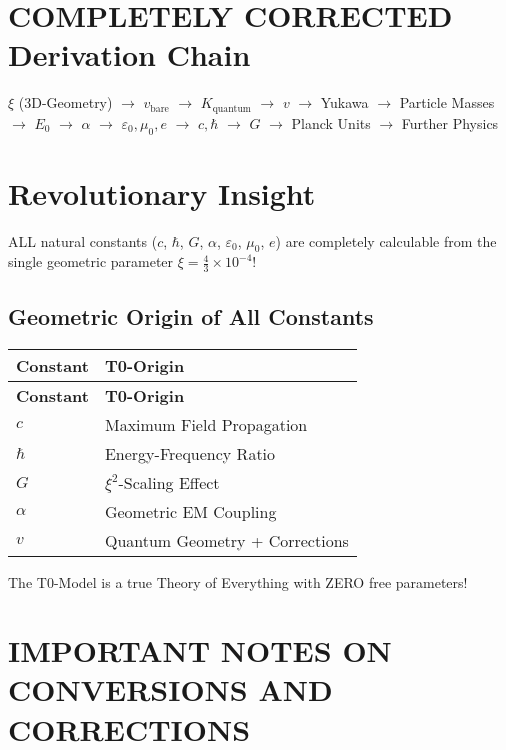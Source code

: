 \documentclass[12pt,a4paper]{article}
\begin{document}
	\section{COMPLETELY CORRECTED Derivation Chain}
	
	\begin{center}
		\(\xi\) (3D-Geometry) \(\rightarrow\) \(v_{\text{bare}}\) \(\rightarrow\) \(K_{\text{quantum}}\) \(\rightarrow\) \(v\) \(\rightarrow\) Yukawa \(\rightarrow\) Particle Masses \(\rightarrow\) \(E_0\) \(\rightarrow\) \(\alpha\) \(\rightarrow\) \(\varepsilon_0, \mu_0, e\) \(\rightarrow\) \(c, \hbar\) \(\rightarrow\) \(G\) \(\rightarrow\) Planck Units \(\rightarrow\) Further Physics
	\end{center}
	
	\section{Revolutionary Insight}
	
	ALL natural constants (\(c\), \(\hbar\), \(G\), \(\alpha\), \(\varepsilon_0\), \(\mu_0\), \(e\)) are completely calculable from the single geometric parameter \(\xi = \frac{4}{3} \times 10^{-4}\)!
	
	\subsection{Geometric Origin of All Constants}
	
	\begin{longtable}{|p{3cm}|p{5cm}|}
		\hline
		\textbf{Constant} & \textbf{T0-Origin} \\
		\hline
		\endfirsthead
		\hline
		\textbf{Constant} & \textbf{T0-Origin} \\
		\hline
		\endhead
		\(c\) & Maximum Field Propagation \\
		\hline
		\(\hbar\) & Energy-Frequency Ratio \\
		\hline
		\(G\) & \(\xi^{2}\)-Scaling Effect \\
		\hline
		\(\alpha\) & Geometric EM Coupling \\
		\hline
		\(v\) & Quantum Geometry + Corrections \\
		\hline
	\end{longtable}
	
	The T0-Model is a true Theory of Everything with ZERO free parameters!
	
	\section{IMPORTANT NOTES ON CONVERSIONS AND CORRECTIONS}
	
\end{document}
